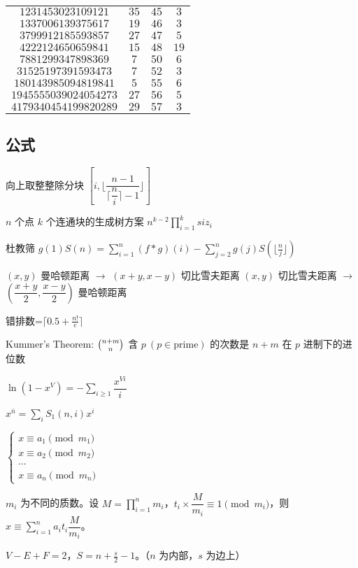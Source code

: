 \documentclass[12pt]{ctexart}
\begin{document}
\begin{tabular}{c|c|c|c}
   $1231453023109121$   & $35$  & $45$ &  $3$  \\
   $1337006139375617$   & $19$  & $46$ &  $3$  \\
   $3799912185593857$   & $27$  & $47$ &  $5$  \\
   $4222124650659841$   & $15$  & $48$ & $19$  \\
   $7881299347898369$   &  $7$  & $50$ &  $6$  \\
   $31525197391593473$  &  $7$  & $52$ &  $3$  \\
  $180143985094819841$  &  $5$  & $55$ &  $6$  \\
  $1945555039024054273$ & $27$  & $56$ &  $5$  \\
  $4179340454199820289$ & $29$  & $57$ &  $3$  \\
 \end{tabular}

\subsection{公式}

向上取整整除分块 $[i,\lfloor\dfrac{n-1}{\lceil\dfrac ni \rceil-1}\rfloor]$

$n$ 个点 $k$ 个连通块的生成树方案 $n^{k-2}\prod\limits_{i=1}^k siz_i$

杜教筛 $g(1)S(n)=\sum\limits_{i=1}^n(f*g)(i)-\sum\limits_{j=2}^ng(j)S(\lfloor\frac nj\rfloor)$

$(x,y)$ 曼哈顿距离 $\to$ $(x+y,x-y)$ 切比雪夫距离  
$(x,y)$ 切比雪夫距离 $\to$ $(\dfrac{x+y}{2},\dfrac{x-y}{2})$ 曼哈顿距离

错排数=$\lceil0.5+\frac{n!}{e}\rceil$

Kummer's Theorem: $\tbinom{n+m}{n}$ 含 $p~(p\in \text {prime})$ 的次数是 $n+m$ 在 $p$ 进制下的进位数

$\ln (1-x^V)=-\sum\limits_{i\ge1}\dfrac{x^{Vi}}{i}$

$x^{\bar n}=\sum\limits_i S_1(n,i)x^i$

$\begin{cases}x\equiv a_1\pmod {m_1}\\x\equiv a_2\pmod {m_2}\\\cdots\\x\equiv a_n\pmod {m_n}\end{cases}$ 

$m_i$ 为不同的质数。设 $M=\prod\limits_{i=1}^nm_i$，$t_i\times \dfrac {M}{m_i}\equiv 1\pmod {m_i}$，则 $x\equiv \sum\limits_{i=1}^na_it_i\dfrac {M}{m_i}$。

$V-E+F=2$，$S=n+\frac s2-1$。（$n$ 为内部，$s$ 为边上）
\end{document}
